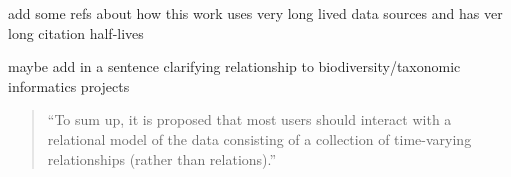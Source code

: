 add some refs about how this work uses very long lived data sources and has ver long citation half-lives

maybe add in a sentence clarifying relationship to biodiversity/taxonomic informatics projects

\begin{quote}
“To sum up, it is proposed that most users should interact with a relational model of the data consisting of a collection of time-varying relationships (rather than relations).”
\end{quote}
